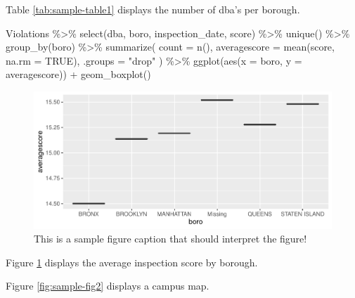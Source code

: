 \documentclass[12pt]{article}
\newenvironment{Shaded}{\begin{snugshade}}{\end{snugshade}}
\newcommand{\AttributeTok}[1]{\textcolor[rgb]{0.77,0.63,0.00}{#1}}
\newcommand{\ConstantTok}[1]{\textcolor[rgb]{0.00,0.00,0.00}{#1}}
\newcommand{\FunctionTok}[1]{\textcolor[rgb]{0.00,0.00,0.00}{#1}}
\newcommand{\NormalTok}[1]{#1}
\newcommand{\SpecialCharTok}[1]{\textcolor[rgb]{0.00,0.00,0.00}{#1}}
\newcommand{\StringTok}[1]{\textcolor[rgb]{0.31,0.60,0.02}{#1}}
\begin{document}
Table \ref{tab:sample-table1} displays the number of dba's per borough.

\begin{Shaded}
\begin{Highlighting}[]
\NormalTok{Violations }\SpecialCharTok{\%\textgreater{}\%}
  \FunctionTok{select}\NormalTok{(dba, boro, inspection\_date, score) }\SpecialCharTok{\%\textgreater{}\%}
  \FunctionTok{unique}\NormalTok{() }\SpecialCharTok{\%\textgreater{}\%}
  \FunctionTok{group\_by}\NormalTok{(boro) }\SpecialCharTok{\%\textgreater{}\%}
  \FunctionTok{summarize}\NormalTok{(}
    \AttributeTok{count =} \FunctionTok{n}\NormalTok{(),}
    \AttributeTok{averagescore =} \FunctionTok{mean}\NormalTok{(score, }\AttributeTok{na.rm =} \ConstantTok{TRUE}\NormalTok{),}
    \AttributeTok{.groups =} \StringTok{"drop"}
\NormalTok{  ) }\SpecialCharTok{\%\textgreater{}\%}
  \FunctionTok{ggplot}\NormalTok{(}\FunctionTok{aes}\NormalTok{(}\AttributeTok{x =}\NormalTok{ boro, }\AttributeTok{y =}\NormalTok{ averagescore)) }\SpecialCharTok{+}
  \FunctionTok{geom\_boxplot}\NormalTok{()}
\end{Highlighting}
\end{Shaded}

\begin{figure}
\centering
\includegraphics{paper_files/figure-latex/sample-fig1-1.pdf}
\caption{\label{fig:sample-fig1}This is a sample figure caption that
should interpret the figure!}
\end{figure}

Figure \ref{fig:sample-fig1} displays the average inspection score by
borough.

Figure \ref{fig:sample-fig2} displays a campus map.
\end{document}
